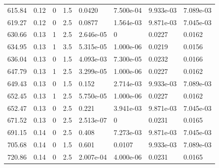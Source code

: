\documentclass[preview]{standalone}
\begin{document}
{{{\begin{tabular}{L{1.2cm}C{1.2cm} C{0.3cm}C{0.5cm} C{1.4cm}C{1.4cm} C{1.4cm}C{1.4cm}}
  615.84  &  0.12  & 0     & 1.5 &  0.0420  & 7.500e-04  & 9.933e-03 &  7.089e-03   \\ 
  619.27  &  0.12  & 0     & 2.5 &  0.0877  & 1.564e-03  & 9.871e-03 &  7.045e-03   \\ 
  630.66  &  0.13  & 1     & 2.5 &  2.646e-05  & 0  & 0.0227 &  0.0162   \\ 
  634.95  &  0.13  & 1     & 3.5 &  5.315e-05  & 1.000e-06  & 0.0219 &  0.0156   \\ 
  636.04  &  0.13  & 0     & 1.5 &  4.093e-03  & 7.300e-05  & 0.0232 &  0.0166   \\ 
  647.79  &  0.13  & 1     & 2.5 &  3.299e-05  & 1.000e-06  & 0.0227 &  0.0162   \\ 
  649.43  &  0.13  & 0     & 1.5 &  0.152  & 2.714e-03  & 9.933e-03 &  7.089e-03   \\ 
  652.45  &  0.13  & 1     & 2.5 &  5.750e-05  & 1.000e-06  & 0.0227 &  0.0162   \\ 
  652.47  &  0.13  & 0     & 2.5 &  0.221  & 3.941e-03  & 9.871e-03 &  7.045e-03   \\ 
  671.52  &  0.13  & 0     & 2.5 &  2.513e-07  & 0  & 0.0231 &  0.0165   \\ 
  691.15  &  0.14  & 0     & 2.5 &  0.408  & 7.273e-03  & 9.871e-03 &  7.045e-03   \\ 
  705.68  &  0.14  & 0     & 1.5 &  0.601  & 0.0107  & 9.933e-03 &  7.089e-03   \\ 
  720.86  &  0.14  & 0     & 2.5 &  2.007e-04  & 4.000e-06  & 0.0231 &  0.0165   \\ 
\hline 
\end{tabular} 

}}}
\end{document}
